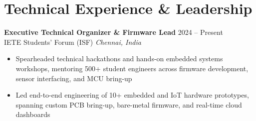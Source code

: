 \documentclass[a4paper,9pt]{extarticle}
\newcommand{\resumeItem}[1]{\item #1}
\newenvironment{resumeItemize}{\begin{itemize}[leftmargin=12pt, itemsep=0.2pt, parsep=0pt, topsep=0.4pt, partopsep=0pt]}{\end{itemize}}
\begin{document}
\section*{Technical Experience \& Leadership}
\textbf{Executive Technical Organizer \& Firmware Lead} \hfill 2024 -- Present \\
IETE Students' Forum (ISF) \hfill \textit{Chennai, India}
\begin{resumeItemize}
    \resumeItem{Spearheaded technical hackathons and hands-on embedded systems workshops, mentoring 500+ student engineers across firmware development, sensor interfacing, and MCU bring-up}
    \resumeItem{Led end-to-end engineering of 10+ embedded and IoT hardware prototypes, spanning custom PCB bring-up, bare-metal firmware, and real-time cloud dashboards}
\end{resumeItemize}
\end{document}
